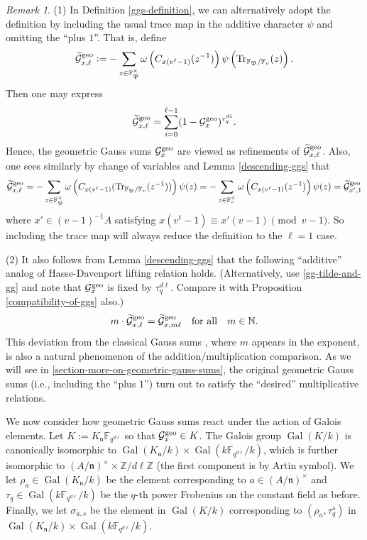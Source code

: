 \documentclass[11pt]{amsart}
\theoremstyle{plain}
\theoremstyle{definition}
\theoremstyle{remark}
\newtheorem{rem}[thm]{Remark}
\numberwithin{equation}{section}
\newcommand{\ZZ}{\mathbb{Z}}
\newcommand{\NN}{\mathbb{N}}
\newcommand{\FF}{\mathbb{F}}
\newcommand{\nfk}{\mathfrak{n}}
\newcommand{\Pfk}{\mathfrak{P}}
\newcommand{\Gcal}{\mathcal{G}}
\newcommand{\Gal}{\operatorname{Gal}}
\newcommand{\Tr}{\operatorname{Tr}}
\newcommand{\Fqdl}{\FF_{q^{d\l}}}
\newcommand{\bggs}{\Gcal^{\textnormal{geo}}}
\let\l\ell
\begin{document}
	\begin{rem}    \label{ggs-with-trace}
		(1) In Definition \ref{ggs-definition}, we can alternatively adopt the definition by including the usual trace map in the additive character $\psi$ and omitting the “plus $1$”.
		That is, define
		$$
		\widetilde{\Gcal}_{x,\l}^{\textnormal{geo}}
		:= -\sum_{z \in \FF_{\Pfk}^\times} \omega\left(C_{x(v^\l-1)}(z^{-1})\right)\psi \left( \Tr_{\FF_{\Pfk}/\FF_v} (z) \right).
		$$
		Then one may express
		\begin{equation}    \label{gg-tilde-and-gg}
			\widetilde{\Gcal}_{x,\l}^{\textnormal{geo}}
			= \sum_{i=0}^{\l-1} (1-\bggs_x)^{\tau_q^{di}}.
		\end{equation}
		Hence, the geometric Gauss sums $\bggs_x$ are viewed as refinements of $\widetilde{\Gcal}_{x,\l}^{\textnormal{geo}}$.
		Also, one sees similarly by change of variables and Lemma \ref{descending-ggs} that
		$$
		\widetilde{\Gcal}_{x,\l}^{\textnormal{geo}}
		= -\sum_{z \in \FF_{\Pfk}^\times} \omega\left(C_{x(v^\l-1)} (\Tr_{\FF_{\Pfk}/\FF_v}(z^{-1}))\right) \psi(z)
		= -\sum_{z \in \FF_v^\times} \omega\left(C_{x(v^\l-1)}(z^{-1})\right) \psi(z)
		= \widetilde{\Gcal}_{x',1}^{\textnormal{geo}}
		$$
		where $x' \in (v-1)^{-1}A$ satisfying $x(v^\l-1) \equiv x'(v-1) \pmod{v-1}$.
		So including the trace map will always reduce the definition to the $\l=1$ case.
		
		(2) It also follows from Lemma \ref{descending-ggs} that the following “additive” analog of Hasse-Davenport lifting relation holds.
		(Alternatively, use \eqref{gg-tilde-and-gg} and note that $\bggs_x$ is fixed by $\tau_q^{d\l}$.
		Compare it with Proposition \ref{compatibility-of-ggs} also.)
		$$
		m \cdot \widetilde{\Gcal}_{x,\l}^{\textnormal{geo}}
		= \widetilde{\Gcal}_{x,m\l}^{\textnormal{geo}}
		\quad
		\text{for all}
		\quad
		m \in \NN.
		$$
		This deviation from the classical Gauss sums \cite{hd1935dienullstellen}, where $m$ appears in the exponent, is also a natural phenomenon of the addition/multiplication comparison.
		As we will see in \ref{section-more-on-geometric-gauss-sums}, the original geometric Gauss sums (i.e., including the “plus $1$”) turn out to satisfy the “desired” multiplicative relations.
	\end{rem}
	
	We now consider how geometric Gauss sums react under the action of Galois elements.
	Let $K := K_\nfk\Fqdl$ so that $\bggs_x \in K$.
	The Galois group $\Gal(K/k)$ is canonically isomorphic to $\Gal(K_\nfk/k) \times \Gal(k\Fqdl/k)$, which is further isomorphic to $(A/\nfk)^\times \times \ZZ/d\l\ZZ$ (the first component is by Artin symbol).
	We let $\rho_a \in \Gal(K_\nfk/k)$ be the element corresponding to $a \in (A/\nfk)^\times$ and $\tau_q \in \Gal(k\Fqdl/k)$ be the $q$-th power Frobenius on the constant field as before.
	Finally, we let $\sigma_{a,s}$ be the element in $\Gal(K/k)$ corresponding to $(\rho_a,\tau_q^s)$ in $\Gal(K_\nfk/k) \times \Gal(k\Fqdl/k)$.
	
\end{document}
